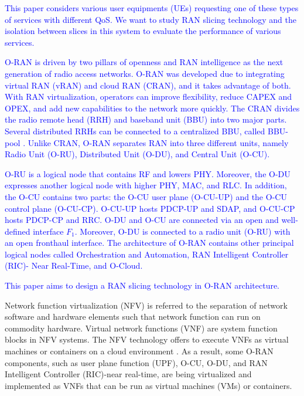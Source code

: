 \documentclass[lettersize,journal]{IEEEtran}
\begin{document}
\textcolor{blue}{This paper considers various user equipments (UEs) requesting one of these types of services with different QoS. We want to study RAN slicing technology and the isolation between slices in this system to evaluate the performance of various services.}

\textcolor{blue}{O-RAN is driven by two pillars of openness and RAN intelligence as the next generation of radio access networks. O-RAN was developed due to integrating virtual RAN (vRAN) and cloud RAN (CRAN), and it takes advantage of both. With RAN virtualization, operators can improve flexibility, reduce CAPEX and OPEX, and add new capabilities to the network more quickly. The CRAN divides the radio remote head (RRH) and baseband unit (BBU) into two major parts. Several distributed RRHs can be connected to a centralized BBU, called BBU-pool \cite{han2019research}. Unlike CRAN, O-RAN separates RAN into three different units, namely Radio Unit (O-RU), Distributed Unit (O-DU), and Central Unit (O-CU).}

\textcolor{blue}{O-RU is a logical node that contains RF and lowers PHY. Moreover, the O-DU expresses another logical node with higher PHY, MAC, and RLC.
In addition, the O-CU contains two parts: the O-CU user plane (O-CU-UP) and the O-CU control plane (O-CU-CP). O-CU-UP hosts PDCP-UP and SDAP, and O-CU-CP hosts PDCP-CP and RRC.
O-DU and O-CU are connected via an open and well-defined interface $F_1$.
Moreover, O-DU is connected to a radio unit (O-RU) with an open fronthaul interface.
The architecture of O-RAN contains other principal logical nodes called Orchestration and Automation, RAN Intelligent Controller (RIC)- Near Real-Time, and O-Cloud\cite{gavrilovska2020cloud,niknam2020intelligent,kazemifard2021minimum,both2021system,ORANArch,ORANML,lin2021toward}.}

\textcolor{blue}{This paper aims to design a RAN slicing technology in O-RAN architecture. }


Network function virtualization (NFV) is referred to the separation of network software and hardware elements such that network function can run on commodity hardware. Virtual network functions (VNF) are system function blocks in NFV systems. The NFV technology offers to execute VNFs as virtual machines or containers on a cloud environment \cite{mijumbi2015network, luo2020online}.
As a result, some O-RAN components, such as user plane function (UPF), O-CU, O-DU, and RAN Intelligent Controller (RIC)-near real-time, are being virtualized and implemented as VNFs that can be run as virtual machines (VMs) or containers.
\end{document}
